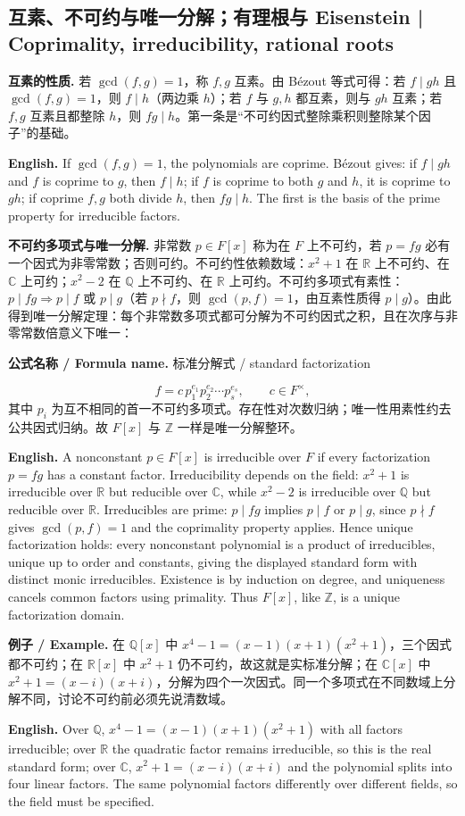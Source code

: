 \documentclass[UTF8,11pt,a4paper]{ctexart}
\newcommand{\EN}[1]{\par\noindent\textbf{English.} #1\par}
\newcommand{\FORMULA}[2]{\par\noindent\textbf{公式名称 / Formula name.} #1 / #2\par}
\newcommand{\EX}[2]{\par\noindent\textbf{例子 / Example.} #1\par\EN{#2}}
\begin{document}
\subsection{互素、不可约与唯一分解；有理根与 Eisenstein | Coprimality, irreducibility, rational roots}
\noindent\textbf{互素的性质.} 若 $\gcd(f,g)=1$，称 $f,g$ 互素。由 Bézout 等式可得：若 $f\mid gh$ 且 $\gcd(f,g)=1$，则 $f\mid h$（两边乘 $h$）；若 $f$ 与 $g,h$ 都互素，则与 $gh$ 互素；若 $f,g$ 互素且都整除 $h$，则 $fg\mid h$。第一条是“不可约因式整除乘积则整除某个因子”的基础。
\EN{If $\gcd(f,g)=1$, the polynomials are coprime. Bézout gives: if $f\mid gh$ and $f$ is coprime to $g$, then $f\mid h$; if $f$ is coprime to both $g$ and $h$, it is coprime to $gh$; if coprime $f,g$ both divide $h$, then $fg\mid h$. The first is the basis of the prime property for irreducible factors.}
\noindent\textbf{不可约多项式与唯一分解.} 非常数 $p\in F[x]$ 称为在 $F$ 上不可约，若 $p=fg$ 必有一个因式为非零常数；否则可约。不可约性依赖数域：$x^2+1$ 在 $\mathbb R$ 上不可约、在 $\mathbb C$ 上可约；$x^2-2$ 在 $\mathbb Q$ 上不可约、在 $\mathbb R$ 上可约。不可约多项式有素性：$p\mid fg\Rightarrow p\mid f$ 或 $p\mid g$（若 $p\nmid f$，则 $\gcd(p,f)=1$，由互素性质得 $p\mid g$）。由此得到唯一分解定理：每个非常数多项式都可分解为不可约因式之积，且在次序与非零常数倍意义下唯一：
\FORMULA{标准分解式}{standard factorization}
\[
f=c\,p_1^{e_1}p_2^{e_2}\cdots p_s^{e_s},\qquad c\in F^\times,
\]
其中 $p_i$ 为互不相同的首一不可约多项式。存在性对次数归纳；唯一性用素性约去公共因式归纳。故 $F[x]$ 与 $\mathbb Z$ 一样是唯一分解整环。
\EN{A nonconstant $p\in F[x]$ is irreducible over $F$ if every factorization $p=fg$ has a constant factor. Irreducibility depends on the field: $x^2+1$ is irreducible over $\mathbb R$ but reducible over $\mathbb C$, while $x^2-2$ is irreducible over $\mathbb Q$ but reducible over $\mathbb R$. Irreducibles are prime: $p\mid fg$ implies $p\mid f$ or $p\mid g$, since $p\nmid f$ gives $\gcd(p,f)=1$ and the coprimality property applies. Hence unique factorization holds: every nonconstant polynomial is a product of irreducibles, unique up to order and constants, giving the displayed standard form with distinct monic irreducibles. Existence is by induction on degree, and uniqueness cancels common factors using primality. Thus $F[x]$, like $\mathbb Z$, is a unique factorization domain.}
\EX{在 $\mathbb Q[x]$ 中 $x^4-1=(x-1)(x+1)(x^2+1)$，三个因式都不可约；在 $\mathbb R[x]$ 中 $x^2+1$ 仍不可约，故这就是实标准分解；在 $\mathbb C[x]$ 中 $x^2+1=(x-i)(x+i)$，分解为四个一次因式。同一个多项式在不同数域上分解不同，讨论不可约前必须先说清数域。}{Over $\mathbb Q$, $x^4-1=(x-1)(x+1)(x^2+1)$ with all factors irreducible; over $\mathbb R$ the quadratic factor remains irreducible, so this is the real standard form; over $\mathbb C$, $x^2+1=(x-i)(x+i)$ and the polynomial splits into four linear factors. The same polynomial factors differently over different fields, so the field must be specified.}
\end{document}
